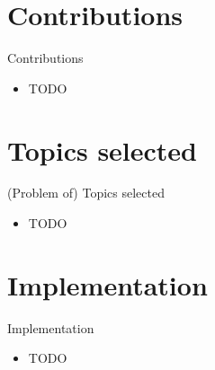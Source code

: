 \documentclass{beamer}
\begin{document}

\section{Contributions}


\begin{frame}{Contributions}

\begin{itemize}
  \item TODO
\end{itemize}

\end{frame}


\section{Topics selected}


\begin{frame}{(Problem of) Topics selected}

\begin{itemize}
  \item TODO
\end{itemize}

\end{frame}


\section{Implementation}


\begin{frame}{Implementation}

\begin{itemize}
  \item TODO
\end{itemize}

\end{frame}

\end{document}
